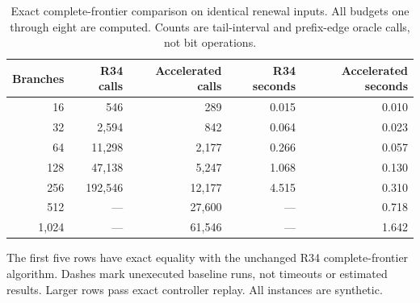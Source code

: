\begin{table}[htbp]\centering
\caption{Exact complete-frontier comparison on identical renewal inputs. All budgets one through eight are computed. Counts are tail-interval and prefix-edge oracle calls, not bit operations.}\label{tab:r35-scale}
\begin{tabular}{rrrrr}\toprule
Branches & R34 calls & Accelerated calls & R34 seconds & Accelerated seconds\\\midrule
16 & 546 & 289 & 0.015 & 0.010\\
32 & 2,594 & 842 & 0.064 & 0.023\\
64 & 11,298 & 2,177 & 0.266 & 0.057\\
128 & 47,138 & 5,247 & 1.068 & 0.130\\
256 & 192,546 & 12,177 & 4.515 & 0.310\\
512 & --- & 27,600 & --- & 0.718\\
1,024 & --- & 61,546 & --- & 1.642\\
\bottomrule\end{tabular}
\par\smallskip\begin{minipage}{.97\textwidth}\small The first five rows have exact equality with the unchanged R34 complete-frontier algorithm. Dashes mark unexecuted baseline runs, not timeouts or estimated results. Larger rows pass exact controller replay. All instances are synthetic.\end{minipage}
\end{table}
